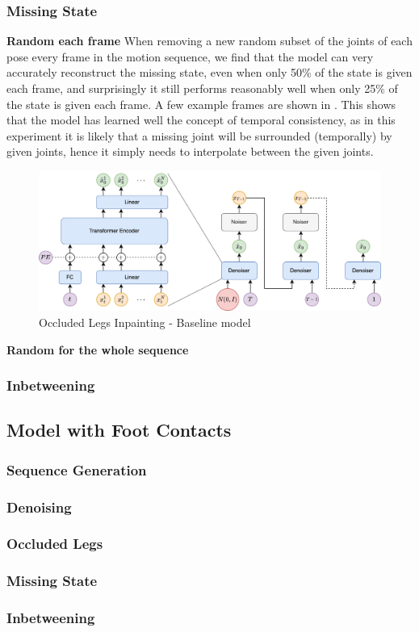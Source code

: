\subsubsection{Missing State}
\textbf{Random each frame}
When removing a new random subset of the joints of each pose every frame in the motion sequence, we find that the model can very accurately reconstruct the missing state, even when only 50\% of the state is given each frame, and surprisingly it still performs reasonably well when only 25\% of the state is given each frame. A few example frames are shown in . This shows that the model has learned well the concept of temporal consistency, as in this experiment it is likely that a missing joint will be surrounded (temporally) by given joints, hence it simply needs to interpolate between the given joints.

\begin{figure}[!ht]
    \centering
    \includegraphics[width=1\textwidth]{Figures/diffusion/Network_diagram.png}
    \caption{Occluded Legs Inpainting - Baseline model}
    \label{fig:baseline_occluded_legs}
\end{figure}

\textbf{Random for the whole sequence}


\subsubsection{Inbetweening}


\subsection{Model with Foot Contacts}

\subsubsection{Sequence Generation}
\subsubsection{Denoising}
\subsubsection{Occluded Legs}
\subsubsection{Missing State}
\subsubsection{Inbetweening}
